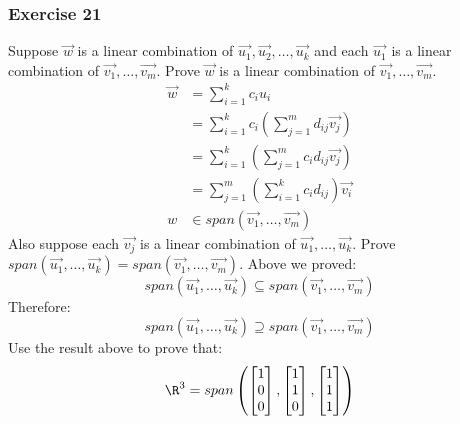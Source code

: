 \documentclass[letterpaper, 12pt]{math}
\begin{document}
\subsubsection*{Exercise 21}
Suppose \( \vec{w} \) is a linear combination of \( \vec{u_1},\vec{u_2},\dots,
\vec{u_k} \) and each \( \vec{u_1} \) is a linear combination of \( \vec{v_1},
\dots,\vec{v_m} \). Prove \( \vec{w} \) is a linear combination of \( \vec{v_1},
\dots,\vec{v_m} \).
\begin{align*}
  \vec{w} &= \sum_{i=1}^{k}c_iu_i \\
  &= \sum_{i=1}^{k}c_i\left(\sum_{j=1}^{m}d_{ij}\vec{v_j}\right) \\
  &= \sum_{i=1}^{k}\left(\sum_{j=1}^{m}c_id_{ij}\vec{v_j}\right) \\
  &= \sum_{j=1}^{m}\left(\sum_{i=1}^{k}c_id_{ij}\right)\vec{v_i} \\
  w &\in span(\vec{v_1},\dots,\vec{v_m})
\end{align*}
Also suppose each \( \vec{v_j} \) is a linear combination of \( \vec{u_1},\dots,
\vec{u_k} \). Prove \( span(\vec{u_1},\dots,\vec{u_k}) =
span(\vec{v_1},\dots,\vec{v_m}) \). Above we proved:
\[ span(\vec{u_1},\dots,\vec{u_k}) \subseteq span(\vec{v_1},\dots,\vec{v_m}) \]
Therefore:
\[ span(\vec{u_1},\dots,\vec{u_k}) \supseteq span(\vec{v_1},\dots,\vec{v_m}) \]
Use the result above to prove that:
\[ \R^3 = span\left(\begin{bmatrix}1 \\ 0 \\ 0\end{bmatrix},
  \begin{bmatrix}1 \\ 1 \\ 0\end{bmatrix},
  \begin{bmatrix}1 \\ 1 \\ 1\end{bmatrix}\right) \]
\end{document}
